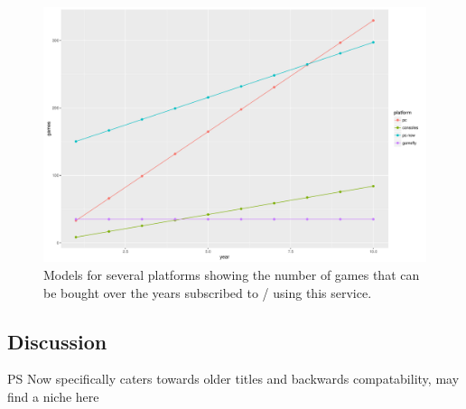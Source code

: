 \begin{figure}[!t]
	\centering
	\includegraphics[width=1.0\columnwidth]{images/games-over-year.pdf}
	\caption{Models for several platforms showing the number of games that can be bought over the years subscribed to / using this service.}
\label{fig:games-over-years}
\end{figure}



\subsection{Discussion}

PS Now specifically caters towards older titles and backwards compatability, may find a niche here










